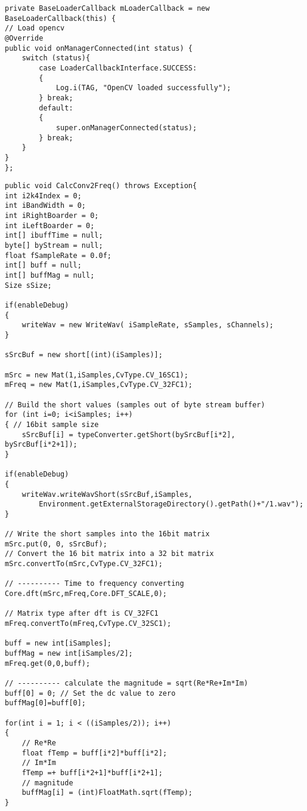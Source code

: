 \documentclass[10pt]{article}
\begin{document}
\begin{tiny}
\begin{lstlisting}
private BaseLoaderCallback mLoaderCallback = new BaseLoaderCallback(this) {
// Load opencv
@Override
public void onManagerConnected(int status) {
	switch (status){
		case LoaderCallbackInterface.SUCCESS:
		{
			Log.i(TAG, "OpenCV loaded successfully");                  
		} break;
		default:
		{
			super.onManagerConnected(status);
		} break;
	}
}
};
\end{lstlisting}
\end{tiny}
\begin{lstlisting}
public void CalcConv2Freq() throws Exception{
int i2k4Index = 0;
int iBandWidth = 0;
int iRightBoarder = 0;
int iLeftBoarder = 0;
int[] ibuffTime = null;
byte[] byStream = null;
float fSampleRate = 0.0f;
int[] buff = null;
int[] buffMag = null;
Size sSize;
		
if(enableDebug)
{
	writeWav = new WriteWav( iSampleRate, sSamples, sChannels);
}
				
sSrcBuf = new short[(int)(iSamples)];      		
		
mSrc = new Mat(1,iSamples,CvType.CV_16SC1);    
mFreq = new Mat(1,iSamples,CvType.CV_32FC1);   
							
// Build the short values (samples out of byte stream buffer)
for (int i=0; i<iSamples; i++)
{ // 16bit sample size
	sSrcBuf[i] = typeConverter.getShort(bySrcBuf[i*2], bySrcBuf[i*2+1]);
}
		
if(enableDebug)
{		
	writeWav.writeWavShort(sSrcBuf,iSamples,
		Environment.getExternalStorageDirectory().getPath()+"/1.wav");
}
				
// Write the short samples into the 16bit matrix
mSrc.put(0, 0, sSrcBuf);
// Convert the 16 bit matrix into a 32 bit matrix 
mSrc.convertTo(mSrc,CvType.CV_32FC1);
		
// ---------- Time to frequency converting 
Core.dft(mSrc,mFreq,Core.DFT_SCALE,0);

// Matrix type after dft is CV_32FC1 
mFreq.convertTo(mFreq,CvType.CV_32SC1);

buff = new int[iSamples];
buffMag = new int[iSamples/2];
mFreq.get(0,0,buff);

// ---------- calculate the magnitude = sqrt(Re*Re+Im*Im)
buff[0] = 0; // Set the dc value to zero
buffMag[0]=buff[0];
		
for(int i = 1; i < ((iSamples/2)); i++)
{
	// Re*Re
	float fTemp = buff[i*2]*buff[i*2];
	// Im*Im
	fTemp =+ buff[i*2+1]*buff[i*2+1];
	// magnitude 
	buffMag[i] = (int)FloatMath.sqrt(fTemp);
}
		

\end{lstlisting}
\end{document}
